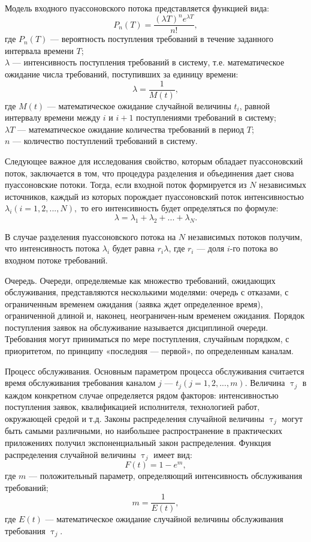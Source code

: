 Модель входного пуассоновского потока представляется функцией вида:
\[P_n(T) = \dfrac{(\lambda T)^ne^{\lambda T}}{n!},\]
где $ P_n(T)  $ --- вероятность поступления требований в течение заданного интервала времени $T$; \\
$\lambda$ --- интенсивность поступления требований в систему, т.е. математическое ожидание числа требований, поступивших за единицу времени:
\[\lambda =  \dfrac{1}{M(t)},\]
где $M(t)$ --- математическое ожидание случайной величины $t_i$, равной интервалу времени между $i$ и $i + 1$ поступлениями требований в систему; \\
$\lambda T$ --- математическое ожидание количества требований в период $T$; \\
$n$ --- количество поступлений требований в систему.

Следующее важное для исследования свойство, которым обладает пуассоновский поток, заключается в том, что процедура разделения и объединения дает снова пуассоновские потоки. Тогда, если входной поток формируется из $N$ независимых источников, каждый из которых порождает пуассоновский поток интенсивностью $\lambda_i (i=1,2,..., N),$ то его интенсивность будет определяться по формуле:
\[\lambda = \lambda_1 + \lambda_2 + ... + \lambda_N.\]

В случае разделения пуассоновского потока на $ N $ независимых потоков получим, что интенсивность потока $\lambda_i$ будет равна $r_i \lambda$, где $r_i$ --- доля $i$-го потока во входном потоке требований.

Очередь. Очереди, определяемые как множество требований, ожидающих обслуживания, представляются несколькими моделями: очередь с отказами, с ограниченным временем ожидания (заявка ждет определенное время), ограниченной длиной и, наконец, неограничен-ным временем ожидания. Порядок поступления заявок на обслуживание называется дисциплиной очереди. Требования могут приниматься по мере поступления, случайным порядком, с приоритетом, по принципу «последняя --- первой», по определенным каналам.

Процесс обслуживания. Основным параметром процесса обслуживания считается время обслуживания требования каналом $j$ --- $t_j(j =1,2,...,m)$. Величина $\uptau_j$ в каждом конкретном случае определяется рядом факторов: интенсивностью поступления заявок, квалификацией исполнителя, технологией работ, окружающей средой и т.д. Законы распределения случайной величины $\uptau_j$ могут быть самыми различными, но наибольшее распространение в практических приложениях получил экспоненциальный закон распределения. Функция распределения случайной величины $\uptau_j$ имеет вид:
\[F(t)=1-e^m,\]
где $m$ --- положительный параметр, определяющий интенсивность обслуживания требований;
\[m=\dfrac{1}{E(t)},\]
где $E(t)$ --- математическое ожидание случайной величины обслуживания требования $\uptau_j$.

